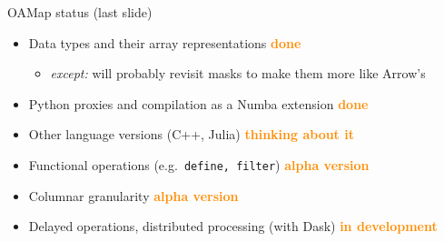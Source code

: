\documentclass[aspectratio=169]{beamer}
\begin{document}
\begin{frame}{OAMap status (last slide)}
\vspace{0.5 cm}
\large
\begin{itemize}\setlength{\itemsep}{0.5 cm}
\item Data types and their array representations \hfill \textcolor{darkorange}{\bf done\hspace{-0.15 cm}}
\begin{itemize}
\item {\it except:} will probably revisit masks to make them more like Arrow's
\end{itemize}

\item Python proxies and compilation as a Numba extension \hfill \textcolor{darkorange}{\bf done}

\item Other language versions (C++, Julia) \hfill \textcolor{darkorange}{\bf thinking about it}

\item Functional operations (e.g.\ {\tt\normalsize define, filter}) \hfill \textcolor{darkorange}{\bf alpha version}

\item Columnar granularity \hfill \textcolor{darkorange}{\bf alpha version}

\item Delayed operations, distributed processing (with Dask) \hfill \textcolor{darkorange}{\bf in development}
\end{itemize}
\end{frame}
\end{document}
